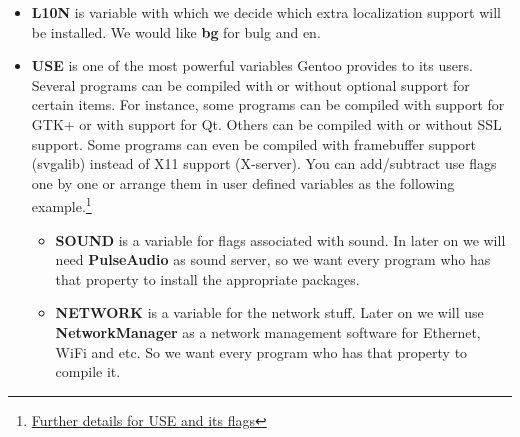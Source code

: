 \documentclass[10pt,a4paper]{article}
\begin{document}
\begin{enumerate}
\begin{enumerate}[label*=\arabic*.]
\begin{itemize}
				
				
				\item \textbf{L10N} is variable with which we decide which extra localization support will be installed. We would like \textbf{bg} for bulg and en.
				
				
				
				\item \textbf{USE} is one of the most powerful variables Gentoo provides to its users. Several programs can be compiled with or without optional support for certain items. For instance, some programs can be compiled with support for GTK+ or with support for Qt. Others can be compiled with or without SSL support. Some programs can even be compiled with framebuffer support (svgalib) instead of X11 support (X-server). You can add/subtract use flags one by one or arrange them in user defined variables as the following example.\footnote{\href{https://wiki.gentoo.org/wiki/Handbook:AMD64/Installation/Base\#Configuring_the_USE_variable}{Further details for USE and its flags}}
				
				
				\begin{itemize}[label={o}]
					\item \textbf{SOUND} is a variable for flags associated with sound. In later on we will need \textbf{PulseAudio} as sound server, so we want every program who has that property to install the appropriate packages.
					
					\item \textbf{NETWORK} is a variable for the network stuff. Later on we will use \textbf{NetworkManager} as a network management software for Ethernet, WiFi and etc. So we want every program who has that property to compile it.
				\end{itemize}
				
			\end{itemize}

		\end{enumerate}		

	\end{enumerate}
	
\end{document}
